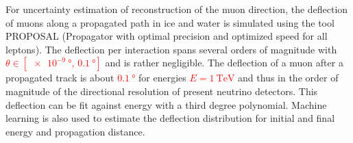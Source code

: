 For uncertainty estimation of reconstruction of the muon direction, the 
deflection of muons along a propagated path in ice and water is simulated using 
the tool PROPOSAL (Propagator with optimal precision and optimized speed for all leptons). 
The deflection per interaction spans several 
orders of magnitude with \textcolor{red}{$\theta \in [\SI[print-unity-mantissa = false]{e-9}{\degree},\, \SI{0.1}{\degree}]$} 
and is rather negligible. The 
deflection of a muon after a propagated track is about \textcolor{red}{$\SI{0.1}{\degree}$} for 
energies \textcolor{red}{$E = \SI{1}{\tera\electronvolt}$} and thus in the order of magnitude of 
the directional resolution of 
present neutrino detectors. This deflection can be fit against energy with a 
third degree polynomial. Machine learning is also used to estimate the 
deflection distribution for initial and final energy and propagation distance. 



